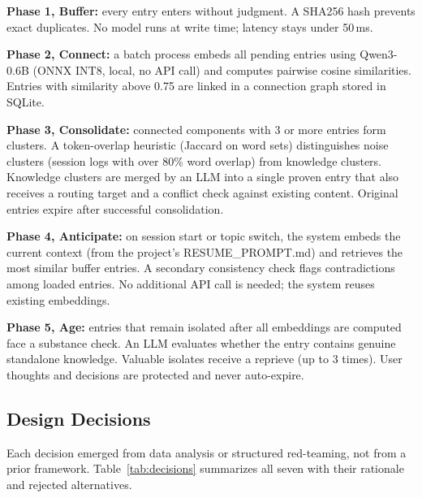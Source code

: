 \documentclass[11pt,a4paper]{article}
\begin{document}
\textbf{Phase 1, Buffer:} every entry enters without judgment.
A SHA256 hash prevents exact duplicates.
No model runs at write time; latency stays under 50\,ms.

\textbf{Phase 2, Connect:} a batch process embeds all pending entries using Qwen3-0.6B (ONNX INT8, local, no API call) and computes pairwise cosine similarities.
Entries with similarity above 0.75 are linked in a connection graph stored in SQLite.

\textbf{Phase 3, Consolidate:} connected components with 3 or more entries form clusters.
A token-overlap heuristic (Jaccard on word sets) distinguishes noise clusters (session logs with over 80\% word overlap) from knowledge clusters.
Knowledge clusters are merged by an LLM into a single proven entry that also receives a routing target and a conflict check against existing content.
Original entries expire after successful consolidation.

\textbf{Phase 4, Anticipate:} on session start or topic switch, the system embeds the current context (from the project's RESUME\_PROMPT.md) and retrieves the most similar buffer entries.
A secondary consistency check flags contradictions among loaded entries.
No additional API call is needed; the system reuses existing embeddings.

\textbf{Phase 5, Age:} entries that remain isolated after all embeddings are computed face a substance check.
An LLM evaluates whether the entry contains genuine standalone knowledge.
Valuable isolates receive a reprieve (up to 3 times).
User thoughts and decisions are protected and never auto-expire.


\subsection{Design Decisions}

Each decision emerged from data analysis or structured red-teaming, not from a prior framework.
Table~\ref{tab:decisions} summarizes all seven with their rationale and rejected alternatives.
\end{document}
